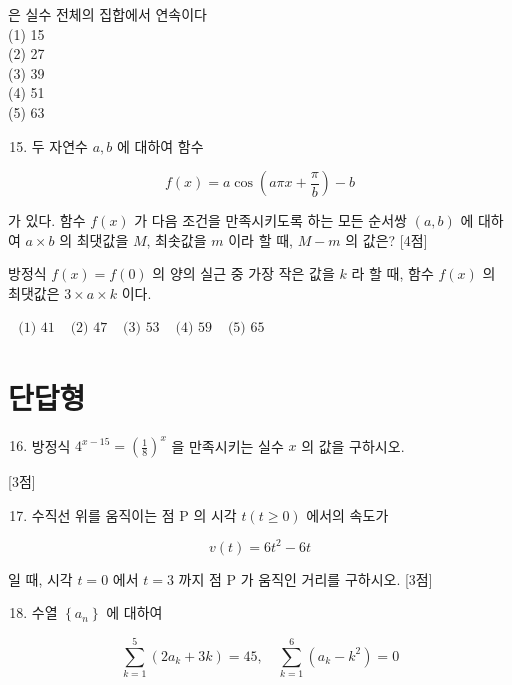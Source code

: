 \documentclass[10pt]{article}
\begin{document}
은 실수 전체의 집합에서 연속이다\\
(1) 15\\
(2) 27\\
(3) 39\\
(4) 51\\
(5) 63

\begin{enumerate}
  \setcounter{enumi}{14}
  \item 두 자연수 $a, b$ 에 대하여 함수
\end{enumerate}

\[
f(x)=a \cos \left(a \pi x+\frac{\pi}{b}\right)-b
\]

가 있다. 함수 $f(x)$ 가 다음 조건을 만족시키도록 하는 모든 순서쌍 $(a, b)$ 에 대하여 $a \times b$ 의 최댓값을 $M$, 최솟값을 $m$ 이라 할 때, $M-m$ 의 값은? [4점]

방정식 $f(x)=f(0)$ 의 양의 실근 중 가장 작은 값을 $k$ 라 할 때, 함수 $f(x)$ 의 최댓값은 $3 \times a \times k$ 이다.

$\begin{array}{lllll}\text { (1) } 41 & \text { (2) } 47 & \text { (3) } 53 & \text { (4) } 59 & \text { (5) } 65\end{array}$

\section*{단답형}
\begin{enumerate}
  \setcounter{enumi}{15}
  \item 방정식 $4^{x-15}=\left(\frac{1}{8}\right)^{x}$ 을 만족시키는 실수 $x$ 의 값을 구하시오.
\end{enumerate}

[3점]

\begin{enumerate}
  \setcounter{enumi}{16}
  \item 수직선 위를 움직이는 점 P 의 시각 $t(t \geq 0)$ 에서의 속도가
\end{enumerate}

\[
v(t)=6 t^{2}-6 t
\]

일 때, 시각 $t=0$ 에서 $t=3$ 까지 점 P 가 움직인 거리를 구하시오. [3점]

\begin{enumerate}
  \setcounter{enumi}{17}
  \item 수열 $\left\{a_{n}\right\}$ 에 대하여
\end{enumerate}

\[
\sum_{k=1}^{5}\left(2 a_{k}+3 k\right)=45, \quad \sum_{k=1}^{6}\left(a_{k}-k^{2}\right)=0
\]
\end{document}
